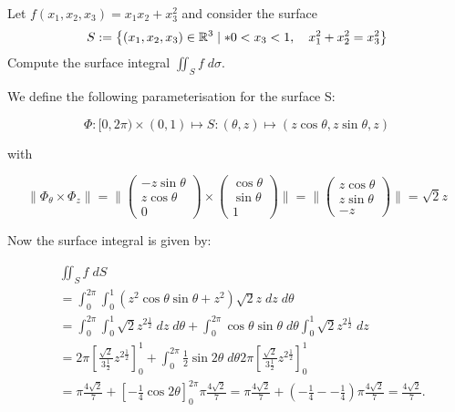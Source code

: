 \documentclass[11pt]{article}
\begin{document}
\begin{exercise}
    Let $f(x_1,x_2,x_3) = x_1 x_2 + x_3^2$ and consider the surface 
    \begin{gather*}
        S := \left\{ (x_1,x_2,x_3) \in \mathbb R^3 \suchthat* 0 < x_3 < 1, \quad x_1^2 + x_2^2 = x_3^2 \right\}
    \end{gather*}
    Compute the surface integral $\iint_S f \;d\sigma$. 
\end{exercise}
\begin{solution}
  We define the following parameterisation for the surface S:

$$
\Phi: [0,2\pi) \times (0,1) \mapsto S: (\theta,z)\mapsto (z\cos\theta, z\sin\theta,z)
$$

with

$$
\|\Phi_{\theta}\times \Phi_{z}\|  = \|\begin{pmatrix} -z\sin\theta \\ z\cos\theta\\0 \end{pmatrix} \times \begin{pmatrix} \cos\theta \\ \sin\theta \\1 \end{pmatrix}\| = \|\begin{pmatrix} z\cos\theta \\ z\sin\theta \\ -z \end{pmatrix}\| = \sqrt{2}z
$$

Now the surface integral is given by:

\begin{align*}
        &
	\iint_{S} f \;d S
        \\&
        = \int_0^{2\pi} \int_0^1 \left(z^2\cos\theta \sin\theta + z^2 \right)\sqrt{2}z\;d z \;d \theta
        \\&
        = \int_0^{2\pi} \int_0^1\sqrt{2}z^{2\frac{1}{2}} \;d z \;d \theta + \int_0^{2\pi} \cos\theta \sin\theta \;d \theta \int_0^1  \sqrt{2}z^{2\frac{1}{2}}\;d z 
        \\&
        =2\pi \left[\frac{\sqrt{2}}{3\frac{1}{2}} z^{2\frac{1}{2}}\right]_0^{1} + \int_0^{2\pi} \frac{1}{2}\sin2\theta \;d \theta 2\pi \left[\frac{\sqrt{2}}{3\frac{1}{2}} z^{2\frac{1}{2}}\right]_0^{1}
        \\&
        =\pi \frac{4\sqrt{2}}{7}+ \left[-\frac{1}{4}\cos2\theta\right]_{0}^{2\pi} \pi \frac{4\sqrt{2}}{7} = \pi \frac{4\sqrt{2}}{7}+ \left(-\frac{1}{4} -  - \frac{1}{4}\right) \pi \frac{4\sqrt{2}}{7} = \frac{4\sqrt{2}}{7} 
        .
    \end{align*}

\end{solution}
\end{document}
